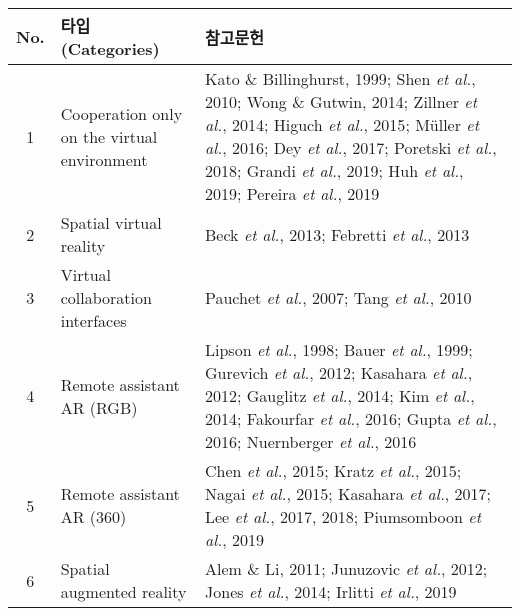 \begin{sidewaystable}
\begin{tabularx}{\textwidth}{cp{}X}
\hline
No.   & 타입 (Categories)                      & \multicolumn{1}{l}{참고문헌} \\ \hline
1     & Cooperation only on the virtual environment & Kato \& Billinghurst, 1999\cite{Kato1999Marker}; Shen \textit{et al.}, 2010\cite{Shen2010Augmented}; Wong \& Gutwin, 2014\cite{Wong2014Support}; Zillner \textit{et al.}, 2014\cite{Zillner20143D}; Higuch \textit{et al.}, 2015\cite{Higuch2015ImmerseBoard}; Müller \textit{et al.}, 2016\cite{Muller2016Virtual}; Dey \textit{et al.}, 2017\cite{Dey2017Effects}; Poretski \textit{et al.}, 2018\cite{Poretski2018Normative}; Grandi \textit{et al.}, 2019\cite{Grandi2019Characterizing}; Huh \textit{et al.}, 2019\cite{Huh2019XR}; Pereira \textit{et al.}, 2019\cite{Pereira2019Extended}      \\
2     & Spatial virtual reality                 & Beck \textit{et al.}, 2013\cite{Beck2013Immersive}; Febretti \textit{et al.}, 2013\cite{Febretti2013CAVE2}      \\
3     & Virtual collaboration interfaces        & Pauchet \textit{et al.}, 2007\cite{Pauchet2007Mutual}; Tang \textit{et al.}, 2010\cite{Tang2010Three}      \\ 
4     & Remote assistant AR (RGB)               & Lipson \textit{et al.}, 1998\cite{lipson1998online}; Bauer \textit{et al.}, 1999\cite{Bauer1999Where}; Gurevich \textit{et al.}, 2012\cite{Gurevich2012TeleAdvisor}; Kasahara \textit{et al.}, 2012\cite{Kasahara2012Second}; Gauglitz \textit{et al.}, 2014\cite{Gauglitz2014InTouch}; Kim \textit{et al.}, 2014\cite{Kim2014Improving}; Fakourfar \textit{et al.}, 2016\cite{Fakourfar2016Stabilized}; Gupta \textit{et al.}, 2016\cite{Gupta2016Do}; Nuernberger \textit{et al.}, 2016\cite{Nuernberger2016Anchoring}       \\
5     & Remote assistant AR (360)               & Chen \textit{et al.}, 2015\cite{Chen20153D}; Kratz \textit{et al.}, 2015\cite{Kratz2015Polly}; Nagai \textit{et al.}, 2015\cite{Nagai2015LiveSphere}; Kasahara \textit{et al.}, 2017\cite{Kasahara2017JackIn}; Lee \textit{et al.}, 2017, 2018\cite{Lee2017Mixed,Lee2018User}; Piumsomboon \textit{et al.}, 2019\cite{Piumsomboon2019Shoulder}      \\
6     & Spatial augmented reality               & Alem \& Li, 2011\cite{Alem2011Study}; Junuzovic \textit{et al.}, 2012\cite{Junuzovic2012IllumiShare}; Jones \textit{et al.}, 2014\cite{Jones2014RoomAlive}; Irlitti \textit{et al.}, 2019\cite{Irlitti2019Conveying}      \\

\end{tabularx}
\end{sidewaystable}
